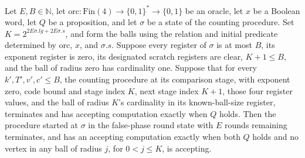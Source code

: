 \begin{theorem}
\label{Complexity.LogProg.ISGen.iter_run}
\leanok
{}
Let $E,B\in\mathbb{N}$, let $\mathrm{orc}:\mathrm{Fin}(4)\to\{0,1\}^*\to\{0,1\}$ be an
oracle, let $x$ be a Boolean word, let $Q$ be a proposition, and let $\sigma$ be a state
of the counting procedure. Set $K=2^{2E\sigma.lg+2E\sigma.s}$, and form the balls using
the relation and initial predicate determined by $\mathrm{orc}$, $x$, and $\sigma.s$.
Suppose every register of $\sigma$ is at most $B$, its exponent register is zero, its
designated scratch registers are clear, $K+1\le B$, and the ball of radius zero has
cardinality one. Suppose that for every $k',T',v',c'\le B$, the counting procedure at
its comparison stage, with exponent zero, code bound and stage index $K$, next stage
index $K+1$, those four register values, and the ball of radius $K$'s cardinality in its
known-ball-size register, terminates and has accepting computation exactly when $Q$
holds. Then the procedure started at $\sigma$ in the false-phase round state with $E$
rounds remaining terminates, and has an accepting computation exactly when both $Q$
holds and no vertex in any ball of radius $j$, for $0<j\le K$, is accepting.
\end{theorem}

